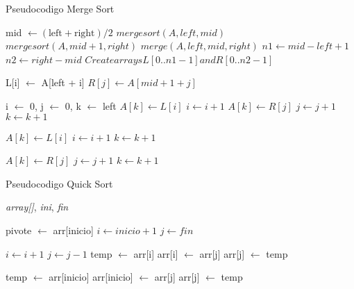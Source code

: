 \begin{algorithm}
\caption{Pseudocodigo Merge Sort}
\begin{algorithmic}
        \State mid $\gets \left( \text{left} + \text{right} \right) / 2$
        \State $mergesort(A, left, mid)$
        \State $mergesort(A, mid + 1, right)$
        \State $merge(A, left, mid, right)$
    \EndIf
\EndFunction
\vspace{0.5cm}
    \State $n1 \gets mid - left + 1$
    \State $n2 \gets right - mid$
    \State $Create arrays L[0..n1-1] and R[0..n2-1]$

        \State L[i] $\gets$ A[left + i]
    \EndFor
        \State $R[j] \gets A[mid + 1 + j]$
    \EndFor

    \State i $\gets$ 0, j $\gets$ 0, k $\gets$ left
            \State $A[k] \gets L[i]$
            \State $i \gets i + 1$
        \Else
            \State $A[k] \gets R[j]$
            \State $j \gets j + 1$
        \EndIf
        \State $k \gets k + 1$
    \EndWhile

        \State $A[k] \gets L[i]$
        \State $i \gets i + 1$
        \State $k \gets k + 1$
    \EndWhile

        \State $A[k] \gets R[j]$
        \State $j \gets j + 1$
        \State $k \gets k + 1$
    \EndWhile
\EndFunction

\end{algorithmic}
\end{algorithm}

\begin{algorithm}
\caption{Pseudocodigo Quick Sort}
\label{alg:label}
\begin{algorithmic}
{\textit{array[]},\textit{ ini},\textit{ fin}}

        \State pivote $\gets$ arr[inicio]
        \State $i \gets inicio + 1$
        \State $j \gets fin$

                \State $i \gets i + 1$
            \EndWhile
                \State $j \gets j - 1$
            \EndWhile
                \State temp $\gets$ arr[i]
                \State arr[i] $\gets$ arr[j]
                \State arr[j] $\gets$ temp
            \EndIf
        \EndWhile
        
        \State temp $\gets$ arr[inicio]
        \State arr[inicio] $\gets$ arr[j]
        \State arr[j] $\gets$ temp

        \State {}
        \State {}
    \EndIf

\EndFunction
\end{algorithmic}
\end{algorithm}

